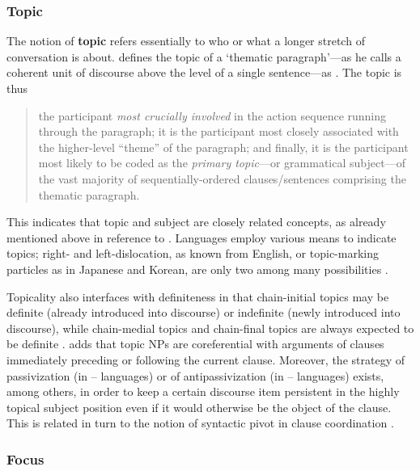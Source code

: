 \subsubsection{Topic}
\label{subsubsec:topic}

The notion of \textbf{topic} refers essentially to who or what a longer stretch
of conversation is about. \citet{givon1983} defines the topic of a `thematic
paragraph'---as he calls a coherent unit of discourse above the level of a
single sentence---as . The topic is thus

\blockcquote[8]{givon1983}{the participant \emph{most crucially involved} in
the action sequence running through the paragraph; it is the participant most
closely associated with the higher-level \enquote{theme} of the paragraph; and
finally, it is the participant most likely to be coded as the \emph{primary
topic}---or grammatical subject---of the vast majority of sequentially-ordered
clauses/sentences comprising the thematic paragraph.}

This indicates that topic and subject are closely related concepts, as already
mentioned above in reference to \citet{comrie1989}. Languages employ various
means to indicate topics; right- and left-dislocation, as known from English,
or topic-marking particles as in Japanese and Korean, are only two among many
possibilities \citep[174]{dixon2010a}.

Topicality also interfaces with definiteness in that chain-initial topics may
be definite (already introduced into discourse) or indefinite (newly introduced
into discourse), while chain-medial topics and chain-final topics are always
expected to be definite \citep[10]{givon1983}. \citet[171]{dixon2010a} adds
that topic NPs are coreferential with arguments of clauses immediately
preceding or following the current clause. Moreover, the strategy of
passivization (in \Nom{}--\Acc{} languages) or of antipassivization (in 
\Erg{}--\Abs{} languages) exists, among others, in order to keep a certain
discourse item persistent in the highly topical subject position even if it
would otherwise be the object of the clause. This is related in turn to the
notion of syntactic pivot in clause coordination \citep[172]{dixon2010a}.

\subsubsection{Focus}
\label{subsubsec:focus}

